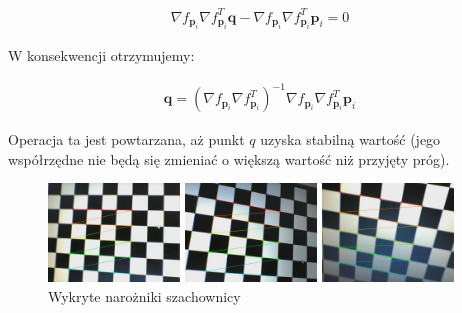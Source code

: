 \documentclass[oneside, eng]{mgr}
\newcommand{\bb}{\textbf}
\begin{document}
\begin{align*}
	\nabla f_{\bb{p}_i} \nabla f_{\bb{p}_i}^T \bb{q} - \nabla f_{\bb{p}_i} \nabla f_{\bb{p}_i}^T \bb{p}_i = 0
\end{align*}

W konsekwencji otrzymujemy:

\begin{align}
	\bb{q} = (\nabla f_{\bb{p}_i} \nabla f_{\bb{p}_i}^T)^{-1} \nabla f_{\bb{p}_i} \nabla f_{\bb{p}_i}^T \bb{p}_i
\end{align}

Operacja ta jest powtarzana, aż punkt $q$ uzyska stabilną wartość (jego współrzędne nie będą się zmieniać o większą wartość niż przyjęty próg).

\begin{figure}
\centering
		\begin{minipage}{3.5cm}
			\includegraphics[width=3.5cm]{left1.jpg}
		\end{minipage}
		\begin{minipage}{3.5cm}
			\includegraphics[width=3.5cm]{left10.jpg}
		\end{minipage}
		\begin{minipage}{3.5cm}
			\includegraphics[width=3.5cm]{left27.jpg}
		\end{minipage}
	\caption{Wykryte narożniki szachownicy}
	\label{fig:corners}
\end{figure}
\end{document}
